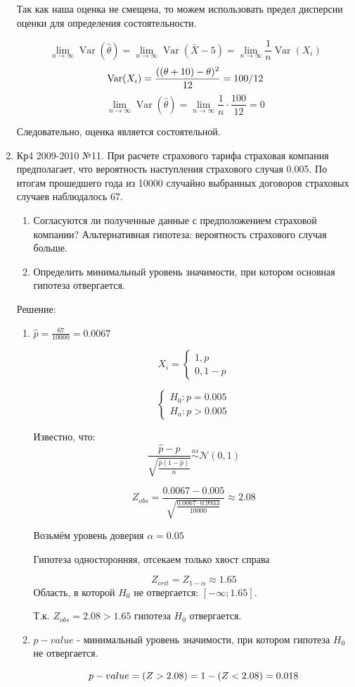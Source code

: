 \documentclass[a4paper,11pt]{article}
\DeclareMathOperator{\Var}{Var}
\let\P\relax
\DeclareMathOperator{\P}{\mathbb{P}}
\newcommand{\cN}{\mathcal{N}}
\begin{document}
\begin{enumerate}
Так как наша оценка не смещена, то можем использовать предел дисперсии оценки для определения состоятельности.

\[
\lim_{n\to\infty} \Var(\hat \theta) = \lim_{n\to\infty} \Var(\bar X - 5) = \lim_{n\to\infty} \frac{1}{n} \Var(X_i)
\]
\[
\Var(X_i) = \frac{((\theta + 10) - \theta)^2}{12} = 100 / 12 \\
\]
\[
\lim_{n\to\infty} \Var(\hat \theta) = \lim_{n\to\infty} \frac{1}{n} \cdot \frac{100}{12} = 0
\]

Следовательно, оценка является состоятельной.

\item \label{Кр4 2009-2010 №11} Кр4 2009-2010 №11. При расчете страхового тарифа страховая компания предполагает, что вероятность наступления страхового случая 0.005. По итогам прошедшего года из 10000 случайно выбранных договоров страховых случаев наблюдалось 67.
\begin{enumerate}
\item Согласуются ли полученные данные с предположением страховой компании? Альтернативная гипотеза: вероятность страхового случая больше.
\item Определить минимальный уровень значимости, при котором основная гипотеза отвергается.
\end{enumerate}

Решение:

\begin{enumerate}
\item
$\hat p = \frac{67}{10000} = 0.0067$

\[
X_i = \begin{cases}
	1, p \\
	0, 1-p
\end{cases}
\]

\[
\begin{cases}
	H_0 : p = 0.005 \\
	H_a : p > 0.005
\end{cases}
\]

Известно, что:
\[
\frac{\hat p - p }{\sqrt{\frac{\hat p (1- \hat p)}{n}}} \stackrel{as}{\sim} \cN(0,1)
\]

\[
Z_{obs} = \frac{0.0067 - 0.005}{\sqrt{\frac{0.0067 \cdot 0.9933}{10000}}} \approx 2.08
\]

Возьмём уровень доверия $\alpha = 0.05$
 
Гипотеза односторонняя, отсекаем только хвост справа
 
\[
Z_{crit} = Z_{1-\alpha} \approx 1.65
\]
Область, в которой $H_0$ не отвергается: $[-\infty ;1.65]$.
 
Т.к. $Z_{obs} = 2.08 > 1.65$ гипотеза $H_0$ отвергается.
 
\item
 
$p-value$ - минимальный уровень значимости, при котором гипотеза $H_0$ не отвергается. 
 
\[
p-value = \P(Z > 2.08) = 1 - \P(Z < 2.08) = 0.018
\]
\end{enumerate}



\end{enumerate}
\end{document}
